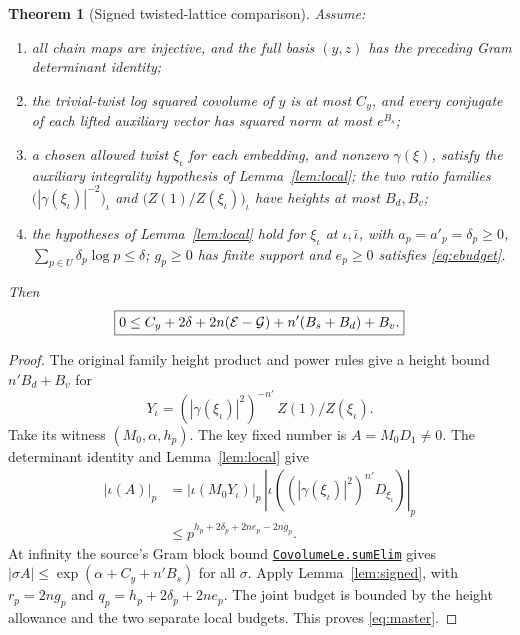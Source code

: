 \documentclass[11pt,letterpaper]{article}
\newtheorem{theorem}{Theorem}[section]
\theoremstyle{remark}\newtheorem{remark}[theorem]{Remark}
\newcommand{\src}[3]{\href{https://github.com/VladimirReshetnikov/ProveIt/blob/89d12dd40424f1217fd818d84877b3da52396a3b/Analysis/GeneralizedRiemannHypothesis/Lean/grh/src/#1.lean\#L#2}{\texttt{#3}}}
\begin{document}
\begin{theorem}[Signed twisted-lattice comparison]\label{thm:compare}
Assume:
\begin{enumerate}
\item all chain maps are injective, and the full basis $(y,z)$ has the preceding Gram determinant identity;
\item the trivial-twist log squared covolume of $y$ is at most $C_y$, and every conjugate of each lifted auxiliary vector has squared norm at most $e^{B_s}$;
\item a chosen allowed twist $\xi_\iota$ for each embedding, and nonzero $\gamma(\xi)$, satisfy the auxiliary integrality hypothesis of Lemma~\ref{lem:local}; the two ratio families $\bigl(|\gamma(\xi_\iota)|^{-2}\bigr)_\iota$ and $\bigl(Z(1)/Z(\xi_\iota)\bigr)_\iota$ have heights at most $B_d,B_v$;
\item the hypotheses of Lemma~\ref{lem:local} hold for $\xi_\iota$ at $\iota,\bar\iota$, with $a_p=a'_p=\delta_p\ge0$, $\sum_{p\in U}\delta_p\log p\le\delta$; $g_p\ge0$ has finite support and $e_p\ge0$ satisfies \eqref{eq:ebudget}.
\end{enumerate}
Then
\begin{equation}\label{eq:master}
 \boxed{0\le C_y+2\delta+2n(\mathcal E-\mathcal G)+n'(B_s+B_d)+B_v.}
\end{equation}
\end{theorem}
\begin{proof}
The original family height product and power rules give a height bound $n'B_d+B_v$ for
\[
 Y_\iota=(|\gamma(\xi_\iota)|^2)^{-n'}\,Z(1)/Z(\xi_\iota).
\]
Take its witness $(M_0,\alpha,h_p)$. The key fixed number is $A=M_0D_1\ne0$. The determinant identity and Lemma~\ref{lem:local} give
\begin{align*}
 |\iota(A)|_p
 &=|\iota(M_0Y_\iota)|_p\,\left|\iota\left((|\gamma(\xi_\iota)|^2)^{n'}D_{\xi_\iota}\right)\right|_p\\
 &\le p^{h_p+2\delta_p+2ne_p-2ng_p}.
\end{align*}
At infinity the source's Gram block bound \src{New/Reduction/Lattices/TwistedLattice}{330}{CovolumeLe.sumElim} gives $|\sigma A|\le\exp(\alpha+C_y+n'B_s)$ for all $\sigma$. Apply Lemma~\ref{lem:signed}, with $r_p=2ng_p$ and $q_p=h_p+2\delta_p+2ne_p$. The joint budget is bounded by the height allowance and the two separate local budgets. This proves \eqref{eq:master}.
\end{proof}
\end{document}

